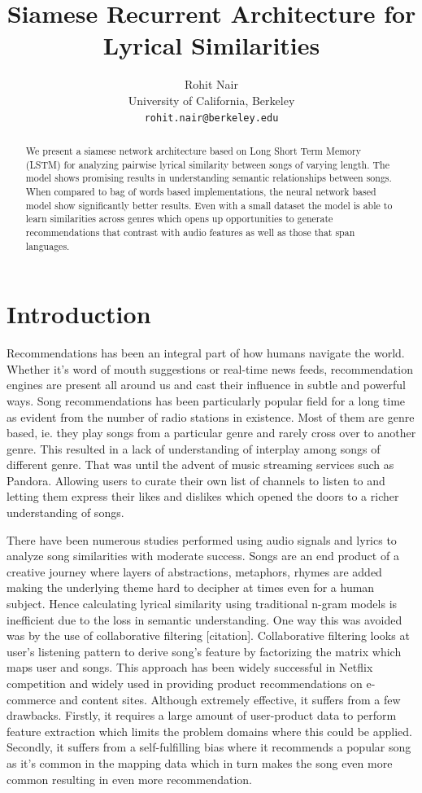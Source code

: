 \documentclass[11pt]{article}
\title{Siamese Recurrent Architecture for Lyrical Similarities}
\author{Rohit Nair \\
  University of California, Berkeley \\
  {\tt rohit.nair@berkeley.edu} \\}
\date{}
\begin{document}
\maketitle
\begin{abstract}
  We present a siamese network architecture based on Long Short Term 
  Memory (LSTM) for analyzing pairwise lyrical similarity between 
  songs of varying length. The model shows promising results in understanding
  semantic relationships between songs. When compared to bag of words 
  based implementations, the neural network based model show significantly 
  better results. Even with a small dataset the model is able to learn
  similarities across genres which opens up opportunities to generate 
  recommendations that contrast with audio features as well as those
  that span languages.
\end{abstract}

\section{Introduction}

Recommendations has been an integral part of how humans navigate the world.
Whether it's word of mouth suggestions or real-time news feeds, 
recommendation engines are present all around us and cast their influence
in subtle and powerful ways. Song recommendations has been particularly
popular field for a long time as evident from the number of radio stations
in existence. Most of them are genre based, ie. they play songs from a 
particular genre and rarely cross over to another genre. This resulted in 
a lack of understanding of interplay among songs of different genre. That
was until the advent of music streaming services such as Pandora. Allowing
users to curate their own list of channels to listen to and letting them
express their likes and dislikes which opened the doors to a richer
understanding of songs.

There have been numerous studies performed using audio signals and lyrics to 
analyze song similarities with moderate success. Songs are an end product 
of a creative journey where layers of abstractions, metaphors, rhymes are 
added making the underlying theme hard to decipher at times even for a human 
subject. Hence calculating lyrical similarity using traditional n-gram 
models is inefficient due to the loss in semantic understanding. One way
this was avoided was by the use of collaborative filtering [citation]. 
Collaborative filtering looks at user's listening pattern to derive song's
feature by factorizing the matrix which maps user and songs. This approach
has been widely successful in Netflix competition and widely used in
providing product recommendations on e-commerce and content sites. Although
extremely effective, it suffers from a few drawbacks. Firstly, it requires
a large amount of user-product data to perform feature extraction which limits 
the problem domains where this could be applied. Secondly, it suffers from a 
self-fulfilling bias where it recommends a popular song as it's 
common in the mapping data which in turn makes the song even more common
resulting in even more recommendation.
\end{document}
